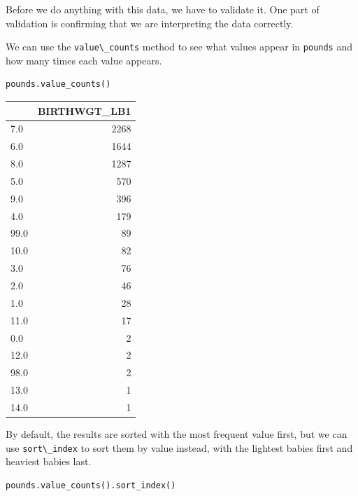 Before we do anything with this data, we have to validate it. One part
of validation is confirming that we are interpreting the data correctly.

We can use the \passthrough{\lstinline!value\_counts!} method to see
what values appear in \passthrough{\lstinline!pounds!} and how many
times each value appears.

\begin{lstlisting}[]
pounds.value_counts()
\end{lstlisting}

\begin{tabular}{lr}
\midrule
{} &  BIRTHWGT\_LB1 \\
\midrule
7.0  &          2268 \\
6.0  &          1644 \\
8.0  &          1287 \\
5.0  &           570 \\
9.0  &           396 \\
4.0  &           179 \\
99.0 &            89 \\
10.0 &            82 \\
3.0  &            76 \\
2.0  &            46 \\
1.0  &            28 \\
11.0 &            17 \\
0.0  &             2 \\
12.0 &             2 \\
98.0 &             2 \\
13.0 &             1 \\
14.0 &             1 \\
\midrule
\end{tabular}

By default, the results are sorted with the most frequent value first,
but we can use \passthrough{\lstinline!sort\_index!} to sort them by
value instead, with the lightest babies first and heaviest babies last.

\begin{lstlisting}[]
pounds.value_counts().sort_index()
\end{lstlisting}

